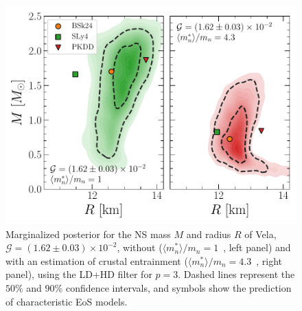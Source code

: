 \begin{figure}[!t]
  \begin{center}
    \includegraphics[width=0.9\linewidth]{figures/mr_from_g_vela.pdf}
  \end{center}
  \caption[Marginalized posterior for the neutron star mass and radius of 
  Vela]{Marginalized posterior for the NS mass $M$ and radius $R$
    of Vela, $\mathcal{G}=(1.62\pm 0.03)\times 10^{-2}$, without 
    ($\langle m_n^*\rangle/m_n = 1$~\cite{Link1999}, left panel) and with an 
    estimation of crustal entrainment ($\langle m_n^*\rangle/m_n
    =4.3$~\cite{Andersson2012}, right panel), using the LD+HD filter for 
    $p=3$. Dashed lines represent the $50\%$ and $90\%$ confidence intervals, 
    and symbols show the prediction of characteristic EoS 
  models.}\label{fig:mr_from_g_vela}
\end{figure}

